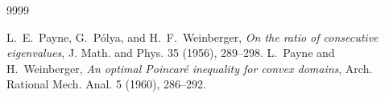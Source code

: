 \documentclass[12pt]{amsart}
\theoremstyle{plain}
\theoremstyle{remark}
\begin{document}
\begin{thebibliography}{9999}

L.~E.~Payne, G.~P\'{o}lya, and H.~F.~Weinberger, \textit{On the ratio of consecutive eigenvalues}, J. Math. and Phys. 35 (1956), 289--298.
L.~Payne and H.~Weinberger, \textit{An optimal Poincar\'e inequality for convex domains}, Arch. Rational Mech. Anal. 5 (1960), 286--292.

\end{thebibliography}
\end{document}
